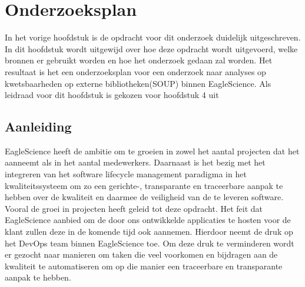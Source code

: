 \chapter{Onderzoeksplan}\label{ch:onderzoekPlan}

In het vorige hoofdstuk is de opdracht voor dit onderzoek duidelijk uitgeschreven. In dit hoofdstuk wordt uitgewijd over hoe deze opdracht wordt uitgevoerd, welke bronnen er gebruikt worden en hoe het onderzoek gedaan zal worden. Het resultaat is het een onderzoeksplan voor een onderzoek naar analyses op kwetsbaarheden op externe bibliotheken(SOUP) binnen EagleScience. Als leidraad voor dit hoofdstuk is gekozen voor hoofdstuk 4 uit \cite{JanLeen2017}

\section{Aanleiding}\label{sec:OP_aanleiding}
EagleScience heeft de ambitie om te groeien in zowel het aantal projecten dat het aanneemt als in het aantal medewerkers. Daarnaast is het bezig met het integreren van het software lifecycle management paradigma in het kwaliteitssysteem om zo een gerichte-, transparante en traceerbare aanpak te hebben over de kwaliteit en daarmee de veiligheid van de te leveren software. Vooral de groei in projecten heeft geleid tot deze opdracht. Het feit dat EagleScience aanbied om de door ons ontwikkelde applicaties te hosten voor de klant zullen deze in de komende tijd ook aannemen. Hierdoor neemt de druk op het DevOps team binnen EagleScience toe. Om deze druk te verminderen wordt er gezocht naar manieren om taken die veel voorkomen en bijdragen aan de kwaliteit te automatiseren om op die manier een traceerbare en transparante aanpak te hebben.

